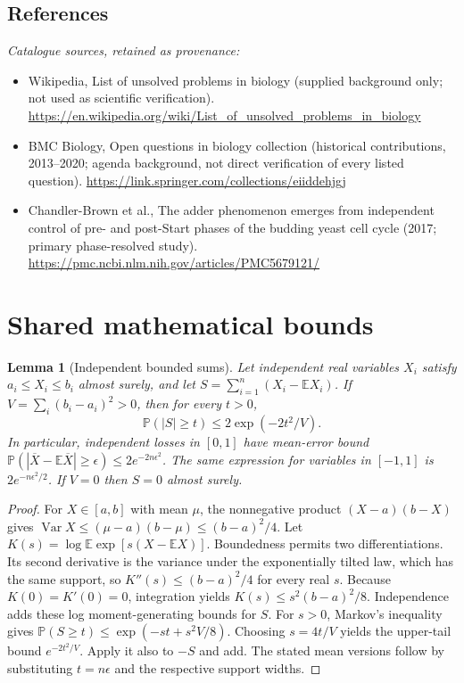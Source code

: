 \documentclass[11pt]{article}
\newcommand{\E}{\mathbb E}
\newcommand{\Prob}{\mathbb P}
\DeclareMathOperator{\Var}{Var}
\providecommand{\E}{\mathbb E}
\providecommand{\Prob}{\mathbb P}
\providecommand{\Var}{\operatorname{Var}}
\newtheorem{sharedlemma}{Lemma}[section]
\begin{document}
\subsection{References}
\noindent\emph{Catalogue sources, retained as provenance:}
\begin{itemize}
\item Wikipedia, List of unsolved problems in biology (supplied background only; not used as scientific verification). \url{https://en.wikipedia.org/wiki/List_of_unsolved_problems_in_biology}
\item BMC Biology, Open questions in biology collection (historical contributions, 2013--2020; agenda background, not direct verification of every listed question). \url{https://link.springer.com/collections/eiiddehjgj}
\item Chandler-Brown et al., The adder phenomenon emerges from independent control of pre- and post-Start phases of the budding yeast cell cycle (2017; primary phase-resolved study). \url{https://pmc.ncbi.nlm.nih.gov/articles/PMC5679121/}
\end{itemize}
\clearpage


\appendix
\section{Shared mathematical bounds}\label{app:bounds}
\begin{sharedlemma}[Independent bounded sums]\label{lem:bounded}
Let independent real variables $X_i$ satisfy $a_i\leq X_i\leq b_i$ almost surely,
and let $S=\sum_{i=1}^n(X_i-\E X_i)$. If
$V=\sum_i(b_i-a_i)^2>0$, then for every $t>0$,
\[
 \Prob(|S|\geq t)\leq 2\exp(-2t^2/V).
\]
In particular, independent losses in $[0,1]$ have mean-error bound
$\Prob(|\overline X-\E\overline X|\geq\epsilon)
\leq2e^{-2n\epsilon^2}$. The same expression for variables in $[-1,1]$
is $2e^{-n\epsilon^2/2}$. If $V=0$ then $S=0$ almost surely.
\end{sharedlemma}
\begin{proof}
For $X\in[a,b]$ with mean $\mu$, the nonnegative product
$(X-a)(b-X)$ gives
$\Var X\leq(\mu-a)(b-\mu)\leq(b-a)^2/4$.
Let $K(s)=\log\E\exp[s(X-\E X)]$.
Boundedness permits two differentiations. Its second derivative is the variance
under the exponentially tilted law, which has the same support, so
$K''(s)\leq(b-a)^2/4$ for every real $s$.
Because $K(0)=K'(0)=0$, integration yields
$K(s)\leq s^2(b-a)^2/8$.
Independence adds these log moment-generating bounds for $S$.
For $s>0$, Markov's inequality gives
$\Prob(S\geq t)\leq\exp(-st+s^2V/8)$.
Choosing $s=4t/V$ yields the upper-tail bound $e^{-2t^2/V}$.
Apply it also to $-S$ and add. The stated mean versions follow by substituting
$t=n\epsilon$ and the respective support widths.
\end{proof}
\end{document}
